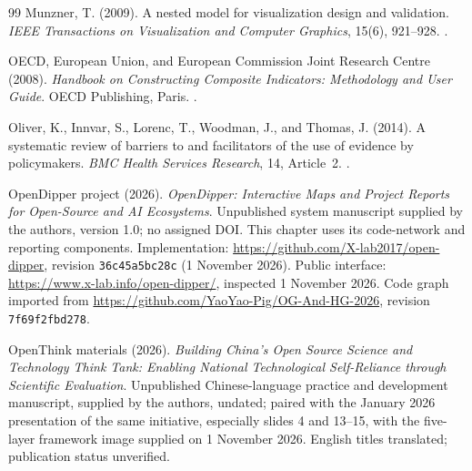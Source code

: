 \begin{thebibliography}{99}
Munzner, T. (2009).
A nested model for visualization design and validation.
\emph{IEEE Transactions on Visualization and Computer Graphics}, 15(6), 921--928.
.

OECD, European Union, and European Commission Joint Research Centre (2008).
\emph{Handbook on Constructing Composite Indicators: Methodology and User Guide}.
OECD Publishing, Paris.
.

Oliver, K., Innvar, S., Lorenc, T., Woodman, J., and Thomas, J. (2014).
A systematic review of barriers to and facilitators of the use of evidence by policymakers.
\emph{BMC Health Services Research}, 14, Article~2.
.

OpenDipper project (2026).
\emph{OpenDipper: Interactive Maps and Project Reports for Open-Source and AI Ecosystems}.
Unpublished system manuscript supplied by the authors, version 1.0; no assigned DOI. This chapter uses its code-network and reporting components.
Implementation: \url{https://github.com/X-lab2017/open-dipper}, revision \texttt{36c45a5bc28c} (1 November 2026).
Public interface: \url{https://www.x-lab.info/open-dipper/}, inspected 1 November 2026.
Code graph imported from \url{https://github.com/YaoYao-Pig/OG-And-HG-2026}, revision \texttt{7f69f2fbd278}.

OpenThink materials (2026).
\emph{Building China's Open Source Science and Technology Think Tank: Enabling National Technological Self-Reliance through Scientific Evaluation}.
Unpublished Chinese-language practice and development manuscript, supplied by the authors, undated; paired with the January 2026 presentation of the same initiative, especially slides 4 and 13--15, with the five-layer framework image supplied on 1 November 2026. English titles translated; publication status unverified.

\end{thebibliography}
\clearpage
\begingroup
\renewcommand{\bibsection}{\section*{References\enspace{\normalfont\sffamily\fontsize{11}{14}\selectfont continued}}}
